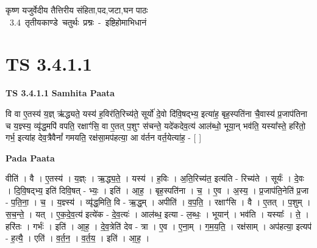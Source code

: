 \documentclass[17pt]{extarticle}
\begin{document}
\begin{titlepage}
    \begin{center}
 
\begin{sanskrit}
    { \Huge
    कृष्ण यजुर्वेदीय तैत्तिरीय संहिता,पद,जटा,घन पाठः 
    }
    \\
    \vspace{2.5cm}
    \mbox{ \Huge
    3.4      तृतीयकाण्डे चतुर्थः प्रश्नः - इष्टिहोमाभिधानं   }
\end{sanskrit}
\end{center}

\end{titlepage}
\tableofcontents
\pagebreak

\section*{ TS 3.4.1.1 }

\textbf{TS 3.4.1.1 } \newline
\textbf{Samhita Paata} \newline

वि वा ए॒तस्य॑ य॒ज्ञ् ऋ॑द्ध्यते॒ यस्य॑ ह॒विर॑ति॒रिच्य॑ते॒ सूर्यो॑ दे॒वो दि॑वि॒षद्भ्य॒ इत्या॑ह॒ बृह॒स्पति॑ना चै॒वास्य॑ प्र॒जाप॑तिना च य॒ज्ञ्स्य॒ व्यृ॑द्ध॒मपि॑ वपति॒ रक्षाꣳ॑सि॒ वा ए॒तत् प॒शुꣳ स॑चन्ते॒ यदे॑कदेव॒त्य॑ आल॑ब्धो॒ भूया॒न् भव॑ति॒ यस्या᳚स्ते॒ हरि॑तो॒ गर्भ॒ इत्या॑ह देव॒त्रैवैनां᳚ गमयति॒ रक्ष॑सा॒मप॑हत्या॒ आ व॑र्तन वर्त॒येत्या॑ह॒ - [  ] \newline

\textbf{Pada Paata} \newline

वीति॑ । वै । ए॒तस्य॑ । य॒ज्ञ्ः । ऋ॒द्ध्य॒ते॒ । यस्य॑ । ह॒विः । अ॒ति॒रिच्य॑त॒ इत्य॑ति - रिच्य॑ते । सूर्यः॑ । दे॒वः । दि॒वि॒षद्भ्य॒ इति॑ दिवि॒षत् - भ्यः॒ । इति॑ । आ॒ह॒ । बृह॒स्पति॑ना । च॒ । ए॒व । अ॒स्य॒ । प्र॒जाप॑ति॒नेति॑ प्र॒जा - प॒ति॒ना॒ । च॒ । य॒ज्ञ्स्य॑ । व्यृ॑द्ध॒मिति॒ वि - ऋ॒द्ध॒म् । अपीति॑ । व॒प॒ति॒ । रक्षाꣳ॑सि । वै । ए॒तत् । प॒शुम् । स॒च॒न्ते॒ । यत् । ए॒क॒दे॒व॒त्य॑ इत्ये॑क - दे॒व॒त्यः॑ । आल॑ब्ध॒ इत्या - ल॒ब्धः॒ । भूयान्॑ । भव॑ति । यस्याः᳚ । ते॒ । हरि॑तः । गर्भः॑ । इति॑ । आ॒ह॒ । दे॒व॒त्रेति॑ देव - त्रा । ए॒व । ए॒ना॒म् । ग॒म॒य॒ति॒ । रक्ष॑साम् । अप॑हत्या॒ इत्यप॑ - ह॒त्यै॒ । एति॑ । व॒र्त॒न॒ । व॒र्त॒य॒ । इति॑ । आ॒ह॒ ।  \newline




\end{document}
